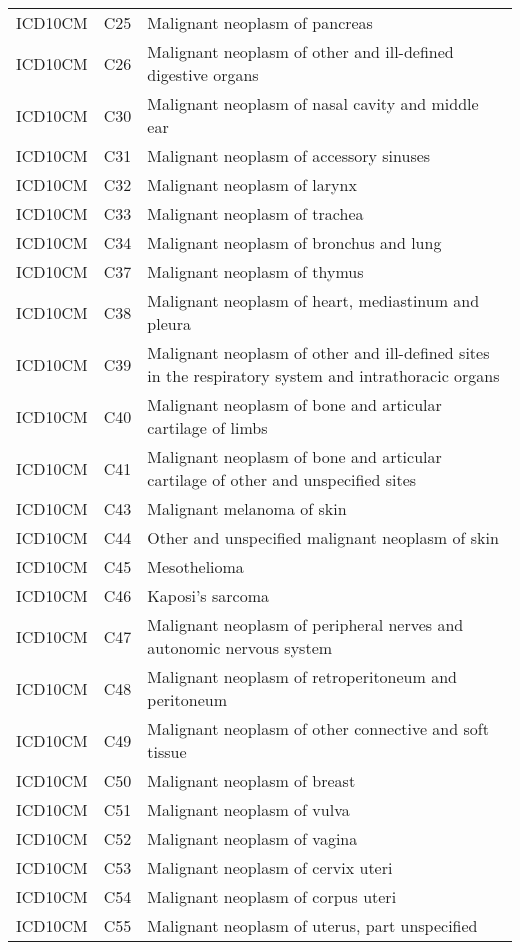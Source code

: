 \begin{table}[ht]
\begin{tabular}{lll}
  ICD10CM & C25 & Malignant neoplasm of pancreas \\ 
  ICD10CM & C26 & Malignant neoplasm of other and ill-defined digestive organs \\ 
  ICD10CM & C30 & Malignant neoplasm of nasal cavity and middle ear \\ 
  ICD10CM & C31 & Malignant neoplasm of accessory sinuses \\ 
  ICD10CM & C32 & Malignant neoplasm of larynx \\ 
  ICD10CM & C33 & Malignant neoplasm of trachea \\ 
  ICD10CM & C34 & Malignant neoplasm of bronchus and lung \\ 
  ICD10CM & C37 & Malignant neoplasm of thymus \\ 
  ICD10CM & C38 & Malignant neoplasm of heart, mediastinum and pleura \\ 
  ICD10CM & C39 & Malignant neoplasm of other and ill-defined sites in the respiratory system and intrathoracic organs \\ 
  ICD10CM & C40 & Malignant neoplasm of bone and articular cartilage of limbs \\ 
  ICD10CM & C41 & Malignant neoplasm of bone and articular cartilage of other and unspecified sites \\ 
  ICD10CM & C43 & Malignant melanoma of skin \\ 
  ICD10CM & C44 & Other and unspecified malignant neoplasm of skin \\ 
  ICD10CM & C45 & Mesothelioma \\ 
  ICD10CM & C46 & Kaposi's sarcoma \\ 
  ICD10CM & C47 & Malignant neoplasm of peripheral nerves and autonomic nervous system \\ 
  ICD10CM & C48 & Malignant neoplasm of retroperitoneum and peritoneum \\ 
  ICD10CM & C49 & Malignant neoplasm of other connective and soft tissue \\ 
  ICD10CM & C50 & Malignant neoplasm of breast \\ 
  ICD10CM & C51 & Malignant neoplasm of vulva \\ 
  ICD10CM & C52 & Malignant neoplasm of vagina \\ 
  ICD10CM & C53 & Malignant neoplasm of cervix uteri \\ 
  ICD10CM & C54 & Malignant neoplasm of corpus uteri \\ 
  ICD10CM & C55 & Malignant neoplasm of uterus, part unspecified \\ 

\end{tabular}
\end{table}
